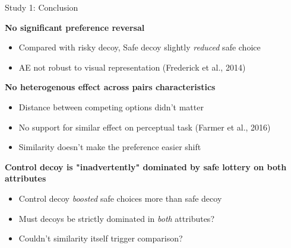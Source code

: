 \documentclass[
  ignorenonframetext,
  aspectratio=169]{beamer}
\begin{document}
\begin{frame}{Study 1: Conclusion}
\label{study-1-conclusion}
\begin{flushleft}
  \textbf{No significant preference reversal}
  \begin{itemize}
    \item Compared with risky decoy, Safe decoy slightly \textit{reduced} safe choice
    \item AE not robust to visual representation (Frederick et al., 2014)
  \end{itemize}
\end{flushleft}

\pause
\begin{flushleft}
  \textbf{No heterogenous effect across pairs characteristics}
  \begin{itemize}
    \item Distance between competing options didn't matter
    \item No support for similar effect on perceptual task (Farmer et al., 2016)
    \item Similarity doesn't make the preference easier shift
  \end{itemize}
\end{flushleft}

\pause
\begin{flushleft}
  \textbf{Control decoy is "inadvertently" dominated by safe lottery on both attributes}
  \begin{itemize}
    \item Control decoy \textit{boosted} safe choices more than safe decoy
    \item Must decoys be strictly dominated in \textit{both} attributes?
    \item Couldn't similarity itself trigger comparison?
  \end{itemize}
\end{flushleft}
\end{frame}
\end{document}
